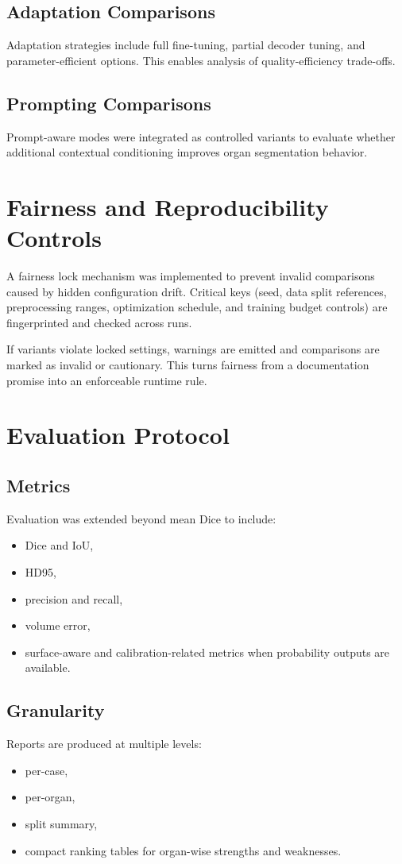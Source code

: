 \documentclass[11pt,a4paper]{article}
\begin{document}
\subsection{Adaptation Comparisons}
Adaptation strategies include full fine-tuning, partial decoder tuning, and parameter-efficient options. This enables analysis of quality-efficiency trade-offs.

\subsection{Prompting Comparisons}
Prompt-aware modes were integrated as controlled variants to evaluate whether additional contextual conditioning improves organ segmentation behavior.

\section{Fairness and Reproducibility Controls}
A fairness lock mechanism was implemented to prevent invalid comparisons caused by hidden configuration drift. Critical keys (seed, data split references, preprocessing ranges, optimization schedule, and training budget controls) are fingerprinted and checked across runs.

If variants violate locked settings, warnings are emitted and comparisons are marked as invalid or cautionary. This turns fairness from a documentation promise into an enforceable runtime rule.

\section{Evaluation Protocol}
\subsection{Metrics}
Evaluation was extended beyond mean Dice to include:
\begin{itemize}
\item Dice and IoU,
\item HD95,
\item precision and recall,
\item volume error,
\item surface-aware and calibration-related metrics when probability outputs are available.
\end{itemize}

\subsection{Granularity}
Reports are produced at multiple levels:
\begin{itemize}
\item per-case,
\item per-organ,
\item split summary,
\item compact ranking tables for organ-wise strengths and weaknesses.
\end{itemize}
\end{document}
